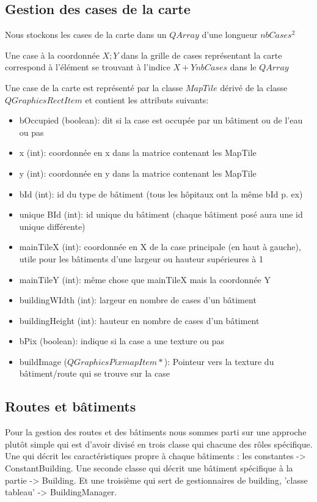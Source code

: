 \documentclass[a4paper,10pt,openany,oneside]{report}
\begin{document}
\subsection{Gestion des cases de la carte}
Nous stockons les cases de la carte dans un $QArray$ d'une longueur $nbCases^{2}$

Une case à la coordonnée $X;Y$ dans la grille de cases représentant la carte correspond à l'élément se trouvant à l'indice $X+Y nbCases$ dans le $QArray$

Une case de la carte est représenté par la classe $MapTile$ dérivé de la classe $QGraphicsRectItem$ et contient les attributs suivants:
\begin{itemize}
\item bOccupied (boolean): dit si la case est occupée par un bâtiment ou de l'eau ou pas
\item x (int): coordonnée en x dans la matrice contenant les MapTile
\item y (int): coordonnée en y dans la matrice contenant les MapTile
\item bId (int): id du type de bâtiment (tous les hôpitaux ont la même bId p. ex)
\item unique BId (int): id unique du bâtiment (chaque bâtiment posé aura une id unique différente)
\item mainTileX (int): coordonnée en X de la case principale (en haut à gauche), utile pour les bâtiments d'une largeur ou hauteur supérieures à 1
\item mainTileY (int): même chose que mainTileX mais la coordonnée Y
\item buildingWIdth (int): largeur en nombre de cases d'un bâtiment
\item buildingHeight (int): hauteur en nombre de cases d'un bâtiment
\item bPix (boolean): indique si la case a une texture ou pas
\item buildImage ($QGraphicsPixmapItem*$): Pointeur vers la texture du bâtiment/route qui se trouve sur la case
\end{itemize}
\subsection{Routes et bâtiments}
Pour la gestion des routes et des bâtiments nous sommes parti sur une approche plutôt simple qui est d'avoir divisé en trois classe qui chacune des rôles spécifique. Une qui décrit les caractéristiques propre à chaque bâtiments : les constantes -> ConstantBuilding. Une seconde classe qui décrit une bâtiment spécifique à la partie -> Building. Et une troisième qui sert de gestionnaires de building, 'classe tableau' -> BuildingManager. 
\end{document}

